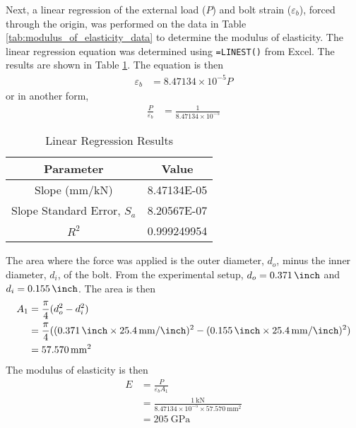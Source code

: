 Next, a linear regression of the external load ($P$) and bolt strain ($\varepsilon_b$), forced through the origin, was performed on the data in Table \ref{tab:modulus_of_elasticity_data} to determine the modulus of elasticity. The linear regression equation was determined using \texttt{=LINEST()} from Excel. The results are shown in Table \ref{tab:modulus_of_elasticity_regression}. The equation is then
\begin{align*}
    \varepsilon_b &= 8.47134 \times 10^{-5} P
\end{align*}
or in another form,
\begin{align*}
    \frac{P}{\varepsilon_b} &= \frac{1}{8.47134 \times 10^{-5}} 
\end{align*}
\begin{table}[h]
    \centering
    \caption{Linear Regression Results}
    \label{tab:modulus_of_elasticity_regression}
    \begin{tabular}{cc}
    \toprule
    Parameter & Value \\
    \midrule
    Slope (mm/kN) & 8.47134E-05 \\
    Slope Standard Error, $S_a$ & 8.20567E-07 \\
    $R^2$ & 0.999249954 \\
    \bottomrule
    \end{tabular}
\end{table}
The area where the force was applied is the outer diameter, $d_o$, minus the inner diameter, $d_i$, of the bolt. From the experimental setup, $d_o = \qty{0.371}{\inch}$ and $d_i = \qty{0.155}{\inch}$. The area is then
\begin{align*}
    A_1 &= \frac{\pi}{4} (d_o^2 - d_i^2) \\
    &= \frac{\pi}{4} ((\qty{0.371}{\inch}\times \qty{25.4}{\milli\meter\per\inch})^2 - (\qty{0.155}{\inch}\times \qty{25.4}{\milli\meter\per\inch})^2) \\
    &= \qty{57.570}{\milli\meter\squared}
\end{align*}
The modulus of elasticity is then
\begin{align*}
    E &= \frac{P}{\varepsilon_b A_1} \\
    &= \frac{\qty{1}{\kilo\newton}}{8.47134 \times 10^{-5} \times \qty{57.570}{\milli\meter\squared}} \\
    &= \boxed{\qty{205}{\giga\pascal}}
\end{align*}   

